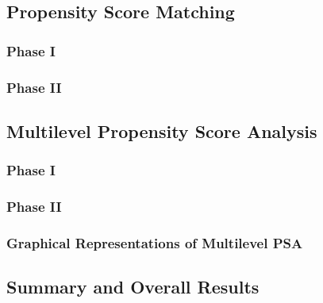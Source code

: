 \documentclass[letterpaper,12p,twoside]{article} %
\begin{document}
%
%
%

%


\clearpage
\subsection{Propensity Score Matching}

\subsubsection{Phase I}

\subsubsection{Phase II}

%


\clearpage
\subsection{Multilevel Propensity Score Analysis}

\subsubsection{Phase I}

\subsubsection{Phase II}

%

\subsubsection{Graphical Representations of Multilevel PSA}



\subsection{Summary and Overall Results}
\end{document}
